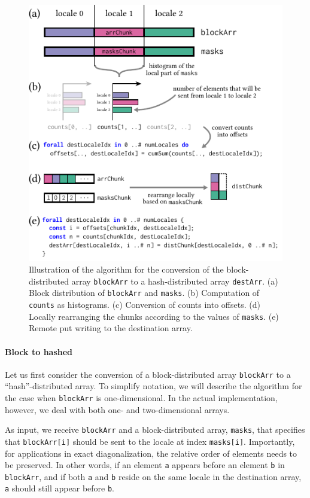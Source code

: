 \begin{figure}[h]
    \centering
    \includegraphics[width=0.7\linewidth]{./chapters/Proceedings_PAW_ATM_2023/algo-arrFromBlockToHashed.pdf}
    \cprotect\caption{Illustration of the algorithm for the conversion of the block-distributed array \verb|blockArr| to a hash-distributed array \verb|destArr|.
    (a) Block distribution of \verb|blockArr| and \verb|masks|.
    (b) Computation of \verb|counts| as histograms.
    (c) Conversion of counts into offsets.
    (d) Locally rearranging the chunks according to the values of \verb|masks|.
    (e) Remote put writing to the destination array.}
    \label{fig:ls23:algo:arrFromBlockToHashed}
\end{figure}


\paragraph{Block to hashed}

Let us first consider the conversion of a block-distributed array \verb|blockArr| to a ``hash''-distributed array. To simplify notation, we will describe the algorithm for the case when \verb|blockArr| is one-dimensional. In the actual implementation, however, we deal with both one- and two-dimensional arrays.

As input, we receive \verb|blockArr| and a block-distributed array, \verb|masks|, that specifies that \verb|blockArr[i]| should be sent to the locale at index \verb|masks[i]|. Importantly, for applications in exact diagonalization, the relative order of elements needs to be preserved. In other words, if an element \verb|a| appears before an element \verb|b| in \verb|blockArr|, and if both \verb|a| and \verb|b| reside on the same locale in the destination array, \verb|a| should still appear before \verb|b|.

